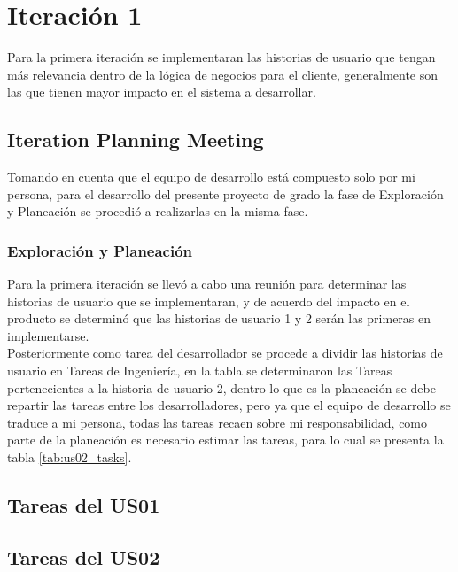 \section{Iteración 1}
\label{sec:iteracion_1}

Para la primera iteración se implementaran las historias de usuario que tengan más relevancia dentro de la lógica de negocios para el cliente, generalmente son las que tienen mayor impacto en el sistema a desarrollar.


\subsection{Iteration Planning Meeting}
\label{sub:Iteration Planning Meeting}


Tomando en cuenta que el equipo de desarrollo está compuesto solo por mi persona, para el desarrollo del presente proyecto de grado la fase de Exploración y Planeación se procedió a realizarlas en la misma fase.

  \subsubsection{Exploración y Planeación}
  \label{subs:Exploración y Planeación}

Para la primera iteración se llevó a cabo una reunión para determinar las historias de usuario que se implementaran, y de acuerdo del impacto en el producto se determinó que las historias de usuario 1 y 2 serán las primeras en implementarse. \\

Posteriormente como tarea del desarrollador se procede a dividir las historias de usuario en Tareas de Ingeniería, en la tabla se determinaron las Tareas pertenecientes a la historia de usuario 2, dentro lo que es la planeación se debe repartir las tareas entre los desarrolladores, pero ya que el equipo de desarrollo se traduce a mi persona, todas las tareas recaen sobre mi responsabilidad, como parte de la planeación es necesario estimar las tareas, para lo cual se presenta la tabla  \ref{tab:us02_tasks}. \\


  \subsection{Tareas del US01}
  \label{sub:us01_tasks}

    

  \subsection{Tareas del US02}
  \label{sub:us02_tasks}


